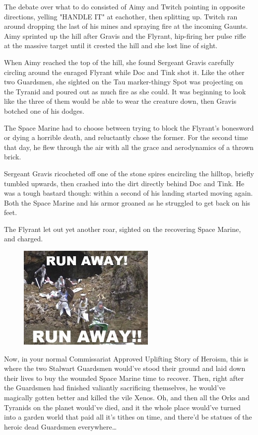 The debate over what to do consisted of Aimy and Twitch pointing in opposite directions, yelling "HANDLE IT" at eachother, then splitting up. 
Twitch ran around dropping the last of his mines and spraying fire at the incoming Gaunts. 
Aimy sprinted up the hill after Gravis and the Flyrant, hip-firing her pulse rifle at the massive target until it crested the hill and she lost line of sight. 


When Aimy reached the top of the hill, she found Sergeant Gravis carefully circling around the enraged Flyrant while Doc and Tink shot it. 
Like the other two Guardsmen, she sighted on the Tau marker-thingy Spot was projecting on the Tyranid and poured out as much fire as she could. 
It was beginning to look like the three of them would be able to wear the creature down, then Gravis botched one of his dodges.

The Space Marine had to choose between trying to block the Flyrant's bonesword or dying a horrible death, and reluctantly chose the former. 
For the second time that day, he flew through the air with all the grace and aerodynamics of a thrown brick.

Sergeant Gravis ricocheted off one of the stone spires encircling the hilltop, briefly tumbled upwards, then crashed into the dirt directly behind Doc and Tink. 
He was a tough bastard though: 
within a second of his landing started moving again. 
Both the Space Marine and his armor groaned as he struggled to get back on his feet.

The Flyrant let out yet another roar, sighted on the recovering Space Marine, and charged.
\begin{figure}
	\begin{center}
		\includegraphics[width=\figwidth]{pics/12/50.png}
	\end{center}
\end{figure}
Now, in your normal Commissariat Approved Uplifting Story of Heroism, this is where the two Stalwart Guardsmen would've stood their ground and laid down their lives to buy the wounded Space Marine time to recover. 
Then, right after the Guardsmen had finished valiantly sacrificing themselves, he would've magically gotten better and killed the vile Xenos. 
Oh, and then all the Orks and Tyranids on the planet would've died, and it the whole place would've turned into a garden world that paid all it's tithes on time, and there'd be statues of the heroic dead Guardsmen everywhere…

